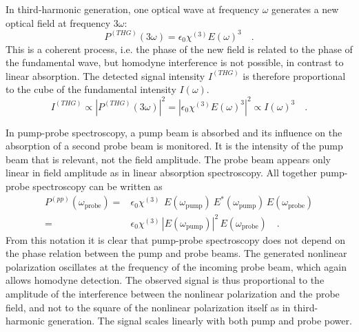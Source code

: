 In third-harmonic generation, one optical wave at frequency $\omega$ generates a new optical field at frequency $3 \omega$: 
%
\begin{equation}
P^{(THG)}(3 \omega) = \epsilon_0 \chi^{(3)} E(\omega)^3  \quad .
\label{eq:fwm_chi3-thg}
\end{equation}
%
This is a coherent process, i.e. the phase of the new field is related to the phase of the fundamental wave, but homodyne interference is not possible, in contrast to linear absorption. The detected signal intensity $I^{(THG)}$ is therefore proportional to the cube of the fundamental intensity $I(\omega)$.
\begin{equation}
I^{(THG)} \propto \left| P^{(THG)}(3 \omega) \right|^2 = \left| \epsilon_0 \chi^{(3)} E(\omega)^3 \right|^2 \propto I(\omega)^3 \quad .
\label{eq:fwm_intensity-thg}
\end{equation}


In pump-probe spectroscopy, a pump beam is absorbed and its influence on the absorption of a second probe beam is monitored. It is the intensity of the pump beam that is relevant, not the field amplitude. The probe beam appears only linear in field amplitude as in linear absorption spectroscopy.
All together pump-probe spectroscopy can be written as
%
\begin{align}
P^{(pp)}(\omega_{\text{probe}}) = &
\epsilon_0 \chi^{(3)} \, \ E(\omega_{\text{pump}}) \ E^*(\omega_{\text{pump}})  \, E(\omega_{\text{probe}})  \nonumber \\
= &
\epsilon_0 \chi^{(3)} \, \left| E(\omega_{\text{pump}})  \right|^2 \, E(\omega_{\text{probe}})  
\quad .
\label{eq:fwm_chi3-pp}
\end{align}
%
From this notation it is clear that pump-probe spectroscopy does not depend on the phase relation between the pump and probe beams.
The generated nonlinear polarization oscillates at the frequency of the incoming probe beam, which again allows homodyne detection. The observed signal is thus proportional to the amplitude of the interference between the nonlinear polarization and the probe field, and not to the square of the nonlinear polarization itself as in third-harmonic generation. The signal scales linearly with both pump and probe power.

